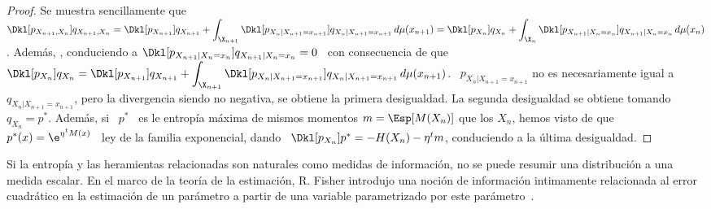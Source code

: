 \begin{proof}
  Se        muestra       sencillamente        que        \       $\displaystyle
  \Dkl[p_{X_{n+1},X_n}]{q_{X_{n+1},X_n}}   =   \Dkl[p_{X_{n+1}}]{q_{X_{n+1}}}  +
  \int_{\X_{n+1}}    \Dkl[p_{X_n|X_{n+1}=x_{n+1}}]{q_{X_n|X_{n+1}=x_{n+1}}}   \,
  d\mu(x_{n+1})        =       \Dkl[p_{X_n}]{q_{X_n}}        +       \int_{\X_n}
  \Dkl[p_{X_{n+1}|X_n=x_n}]{q_{X_{n+1}|X_n=x_n}}   \,   d\mu(x_n)$.    Adem\'as,
  ,  conduciendo  a
  $\Dkl[p_{X_{n+1}|X_n=x_n}]{q_{X_{n+1}|X_n =  x_n}} = 0$ \  con consecuencia de
  que \ $\displaystyle \Dkl[p_{X_n}]{q_{X_n}} = \Dkl[p_{X_{n+1}}]{q_{X_{n+1}}} +
  \int_{\X_{n+1}}  \Dkl[p_{X_n|X_{n+1}   =  x_{n+1}}]{q_{X_n|X_{n+1}  =
      x_{n+1}}}  \,  d\mu(x_{n+1})$.   \   $p_{X_n|X_{n+1}  =  x_{n+1}}$  no  es
  necesariamente  igual a  \ $q_{X_n|X_{n+1}  = x_{n+1}}$,  pero  la divergencia
  siendo no negativa, se obtiene la primera desigualdad.  La segunda desigualdad
  se obtiene tomando \ $q_{X_n} = p^*$.  Adem\'as, si \ $p^*$ \ es le entrop\'ia
  m\'axima de mismos  momentos $m = \Esp[M(X_n)]$ que los  $X_n$, hemos visto de
  que \  $p^*(x) = \e^{\eta^t  M(x)}$ \ ley  de la familia exponencial,  dando \
  $\Dkl[p_{X_n}]{p^*}  =  -H(X_n)  -   \eta^t  m$,  conduciendo  a  la  \'ultima
  desigualdad.
\end{proof}



\label{Ssec:SZ:EUR}



\label{Ssec:SZ:Fisher}

Si la  entrop\'ia y las heramientas  relacionadas son naturales  como medidas de
informaci\'on, no se  puede resumir una distribuci\'on a  una medida escalar. En
el marco de la teor\'ia de  la estimaci\'on, R. Fisher introdujo una noci\'on de
informaci\'on intimamente  relacionada al error cuadr\'atico  en la estimaci\'on
de   un  par\'ametro   a  partir   de  una   variable  parametrizado   por  este
par\'ametro~\cite{Fis22, Fis25:07, Kay93, Bos07, CovTho06, Fri04}.

